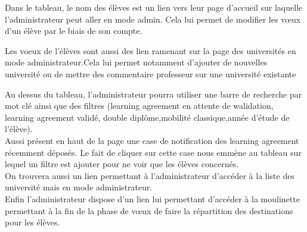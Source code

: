 Dans le tableau, le nom des élèves est un lien vers leur page d'accueil sur laquelle l'administrateur peut aller en mode admin. Cela lui permet de modifier les vœux d'un élève par le biais de son compte.

Les voeux de l'élèves sont aussi des lien ramenant sur la page des universités en mode administrateur.Cela lui permet notamment d'ajouter de nouvelles université ou de mettre des commentaire professeur sur une université existante

Au dessus du tableau, l'administrateur pourra utiliser une barre de recherche par mot clé ainsi que des filtres (learning agreement en attente de walidation, learning agreement validé, double diplôme,mobilité classique,année d'étude de l'élève).\\

Aussi présent en haut de la page une case de notification des learning agreement récemment déposés. Le fait de cliquer sur cette case nous emmène au tableau sur lequel un filtre est ajouter pour ne voir que les élèves concernés.\\

On trouvera aussi un lien permettant à l'administrateur d'accéder à la liste des université mais en mode administrateur.\\

Enfin l'administrateur dispose d'un lien lui permettant d'accéder à la moulinette permettant à la fin de la phase de vœux de faire la répartition des destinations pour les élèves.